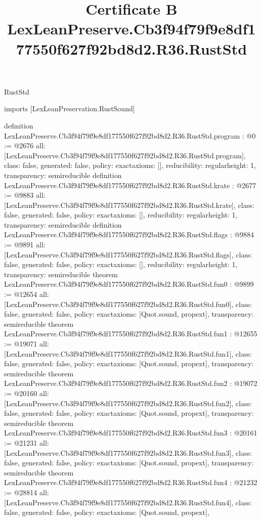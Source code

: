 \begin{lexlean}{RustStd}
\title{Certificate B LexLeanPreserve.Cb3f94f79f9e8df177550f627f92bd8d2.R36.RustStd}
\begin{coremodule}
imports [LexLeanPreservation.RustSound]

definition LexLeanPreserve.Cb3f94f79f9e8df177550f627f92bd8d2.R36.RustStd.program : @0 := @2676 {
  all: [LexLeanPreserve.Cb3f94f79f9e8df177550f627f92bd8d2.R36.RustStd.program],
  class: false,
  generated: false,
  policy: exact{axioms: []},
  reducibility: regular{height: 1},
  transparency: semireducible
}
definition LexLeanPreserve.Cb3f94f79f9e8df177550f627f92bd8d2.R36.RustStd.krate : @2677 := @9883 {
  all: [LexLeanPreserve.Cb3f94f79f9e8df177550f627f92bd8d2.R36.RustStd.krate],
  class: false,
  generated: false,
  policy: exact{axioms: []},
  reducibility: regular{height: 1},
  transparency: semireducible
}
definition LexLeanPreserve.Cb3f94f79f9e8df177550f627f92bd8d2.R36.RustStd.flags : @9884 := @9891 {
  all: [LexLeanPreserve.Cb3f94f79f9e8df177550f627f92bd8d2.R36.RustStd.flags],
  class: false,
  generated: false,
  policy: exact{axioms: []},
  reducibility: regular{height: 1},
  transparency: semireducible
}
theorem LexLeanPreserve.Cb3f94f79f9e8df177550f627f92bd8d2.R36.RustStd.fun0 : @9899 := @12654 {
  all: [LexLeanPreserve.Cb3f94f79f9e8df177550f627f92bd8d2.R36.RustStd.fun0],
  class: false,
  generated: false,
  policy: exact{axioms: [Quot.sound, propext]},
  transparency: semireducible
}
theorem LexLeanPreserve.Cb3f94f79f9e8df177550f627f92bd8d2.R36.RustStd.fun1 : @12655 := @19071 {
  all: [LexLeanPreserve.Cb3f94f79f9e8df177550f627f92bd8d2.R36.RustStd.fun1],
  class: false,
  generated: false,
  policy: exact{axioms: [Quot.sound, propext]},
  transparency: semireducible
}
theorem LexLeanPreserve.Cb3f94f79f9e8df177550f627f92bd8d2.R36.RustStd.fun2 : @19072 := @20160 {
  all: [LexLeanPreserve.Cb3f94f79f9e8df177550f627f92bd8d2.R36.RustStd.fun2],
  class: false,
  generated: false,
  policy: exact{axioms: [Quot.sound, propext]},
  transparency: semireducible
}
theorem LexLeanPreserve.Cb3f94f79f9e8df177550f627f92bd8d2.R36.RustStd.fun3 : @20161 := @21231 {
  all: [LexLeanPreserve.Cb3f94f79f9e8df177550f627f92bd8d2.R36.RustStd.fun3],
  class: false,
  generated: false,
  policy: exact{axioms: [Quot.sound, propext]},
  transparency: semireducible
}
theorem LexLeanPreserve.Cb3f94f79f9e8df177550f627f92bd8d2.R36.RustStd.fun4 : @21232 := @28814 {
  all: [LexLeanPreserve.Cb3f94f79f9e8df177550f627f92bd8d2.R36.RustStd.fun4],
  class: false,
  generated: false,
  policy: exact{axioms: [Quot.sound, propext]},
}
\end{coremodule}
\end{lexlean}
